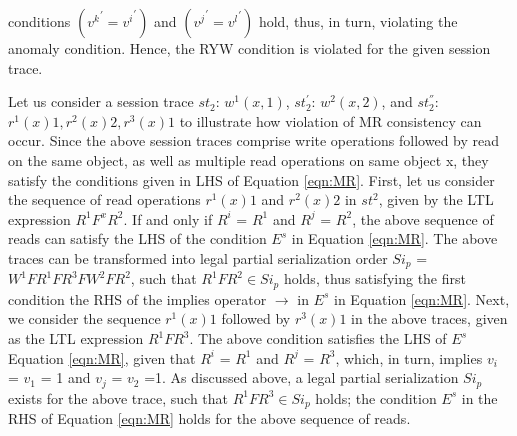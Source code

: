 \documentclass{sig-alternate-05-2015}
\begin{document}
conditions $\left(  {v^k}^{'} = {v^i}^{'} \right) $ and $\left( {v^j}^{'} = {v^l}^{'} \right)$ hold, thus, in turn,
violating the anomaly condition.
  Hence, the RYW condition is violated for the given session trace.
 \par Let us consider a session trace $\mathit{st}_2$:  $w^1(x,1)$, $\mathit{st}_2^{'}$: $w^2(x,2)$, and $\mathit{st}_2^{''}$: $r^1(x){1}, r^2(x){2}, r^3(x){1}$ to illustrate how
 violation of MR consistency can occur. Since the above session traces comprise write operations followed by read on the same object, as well
 as multiple read operations on same object x, they satisfy the conditions given in LHS of Equation \ref{eqn:MR}.
 First, let us consider the sequence of read operations $r^1(x){1}$ and $r^2(x){2}$ in $\mathit{st}^2$, given by the LTL expression $R^1 F^x R^2$.
 If and only if $R^i$ = $R^1$ and $R^j$ = $R^2$, the above sequence of reads can satisfy the LHS of the condition  $E^{s}$ in Equation \ref{eqn:MR}.
  The above traces can be transformed into legal partial serialization order $\mathit{Si}_p$ =
 $W^1 F R^1 F R^3 F W^2 F R^2$, such that $R^1 F R^2 \in \mathit{Si}_p$ holds, thus satisfying
 the first condition the RHS of the implies operator $\rightarrow$
 in  $E^{s}$ in Equation \ref{eqn:MR}.
   Next, we consider the sequence $r^1(x){1}$ followed by $r^3(x){1}$ in the above traces, given as the LTL expression $R^1 F R^3$. The above condition satisfies the LHS of $E^s$ Equation
   \ref{eqn:MR}, given that
  $R^i$ = $R^1$ and $R^j$ = $R^3$, which, in turn, implies $v_i$ = $v_1$ = 1 and $v_j$ = $v_2$ =1. As discussed above, a
  legal partial serialization $\mathit{Si}_p$ exists for the above trace, such that $R^1 F R^3 \in \mathit{Si}_p$
  holds; the condition $E^s$  in the RHS of Equation \ref{eqn:MR} holds for the above sequence of reads.
\end{document}
